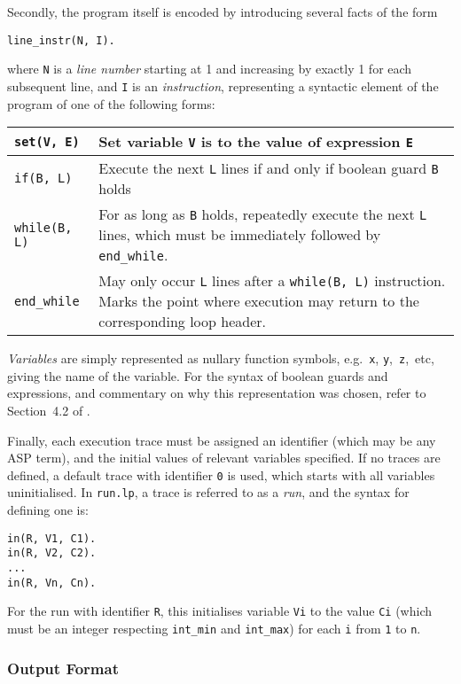 \documentclass[a4paper,twoside,notitlepage,12pt]{article}
\begin{document}
Secondly, the program itself is encoded by introducing several facts of the form
\begin{verbatim}
line_instr(N, I).
\end{verbatim}
where \verb|N| is a \emph{line number} starting at 1 and increasing by exactly 1 for
each subsequent line, and \verb|I| is an \emph{instruction}, representing a syntactic
element of the program of one of the following forms:

\begin{tabularx}{\textwidth}{|l|X|}
\hline
\verb|set(V, E)| &
Set variable \verb|V| is to the value of expression \verb|E| \\*
\hline
\verb|if(B, L)| &
Execute the next \verb|L| lines if and only if boolean guard \verb|B| holds \\*
\hline
\verb|while(B, L)| &
For as long as \verb|B| holds, repeatedly execute the next \verb|L| lines, which must 
be immediately followed by \verb|end_while|. \\*
\hline
\verb|end_while| &
May only occur \verb|L| lines after a \verb|while(B, L)| instruction. Marks the point 
where execution may return to the corresponding loop header. \\*
\hline
\end{tabularx}

\emph{Variables} are simply represented as nullary function symbols, e.g.\ \verb|x|, 
\verb|y|,\ \verb|z|,\ etc, giving the name of the variable. For the syntax of boolean 
guards and expressions, and commentary on why this representation was chosen, refer to 
Section~4.2 of \cite{final}.

Finally, each execution trace must be assigned an identifier (which may be any ASP 
term), and the initial values of relevant variables specified. If no traces are defined, 
a default trace with identifier \verb|0| is used, which starts with all variables 
uninitialised. In \verb|run.lp|, a trace is referred to as a \emph{run}, and the syntax 
for defining one is:

\begin{verbatim}
in(R, V1, C1).
in(R, V2, C2).
...
in(R, Vn, Cn).
\end{verbatim}

For the run with identifier \verb|R|, this initialises variable \verb|Vi| to the value 
\verb|Ci| (which must be an integer respecting \verb|int_min| and \verb|int_max|) for 
each \verb|i| from \verb|1| to \verb|n|.

\subsubsection{Output Format} \label{sec:sim:out}
\end{document}
